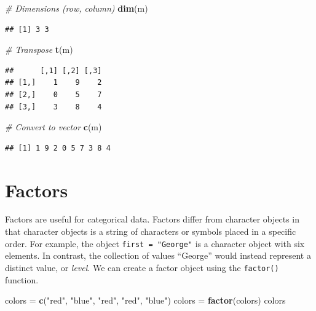 \documentclass[
]{book}
\newenvironment{Shaded}{\begin{snugshade}}{\end{snugshade}}
\newcommand{\CommentTok}[1]{\textcolor[rgb]{0.56,0.35,0.01}{\textit{#1}}}
\newcommand{\KeywordTok}[1]{\textcolor[rgb]{0.13,0.29,0.53}{\textbf{#1}}}
\newcommand{\NormalTok}[1]{#1}
\newcommand{\StringTok}[1]{\textcolor[rgb]{0.31,0.60,0.02}{#1}}
\begin{document}
\begin{Shaded}
\begin{Highlighting}[]
\CommentTok{# Dimensions (row, column)}
\KeywordTok{dim}\NormalTok{(m)}
\end{Highlighting}
\end{Shaded}

\begin{verbatim}
## [1] 3 3
\end{verbatim}

\begin{Shaded}
\begin{Highlighting}[]
\CommentTok{# Transpose}
\KeywordTok{t}\NormalTok{(m)}
\end{Highlighting}
\end{Shaded}

\begin{verbatim}
##      [,1] [,2] [,3]
## [1,]    1    9    2
## [2,]    0    5    7
## [3,]    3    8    4
\end{verbatim}

\begin{Shaded}
\begin{Highlighting}[]
\CommentTok{# Convert to vector }
\KeywordTok{c}\NormalTok{(m)}
\end{Highlighting}
\end{Shaded}

\begin{verbatim}
## [1] 1 9 2 0 5 7 3 8 4
\end{verbatim}

\hypertarget{factors}{%
\section{Factors}\label{factors}}

Factors are useful for categorical data. Factors differ from character objects in that character objects is a string of characters or symbols placed in a specific order. For example, the object \texttt{first\ =\ "George"} is a character object with six elements. In contrast, the collection of values ``George'' would instead represent a distinct value, or \emph{level}. We can create a factor object using the \texttt{factor()} function.

\begin{Shaded}
\begin{Highlighting}[]
\NormalTok{colors =}\StringTok{ }\KeywordTok{c}\NormalTok{(}\StringTok{"red"}\NormalTok{, }\StringTok{"blue"}\NormalTok{, }\StringTok{"red"}\NormalTok{, }\StringTok{"red"}\NormalTok{, }\StringTok{"blue"}\NormalTok{)}
\NormalTok{colors =}\StringTok{ }\KeywordTok{factor}\NormalTok{(colors)}
\NormalTok{colors}
\end{Highlighting}
\end{Shaded}
\end{document}
